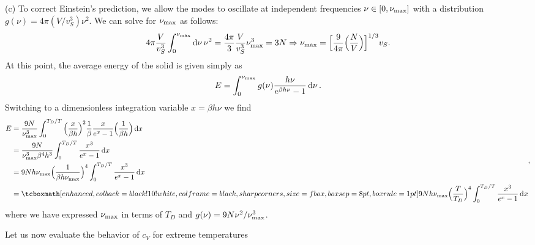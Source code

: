 {(c) To correct Einstein's prediction, we allow the modes to oscillate at independent frequencies $\nu \in [0,\nu_{\rm max}]$ with a distribution $g(\nu) = 4 \pi (V/v_{S}^3) \nu^2$.
We can solve for $\nu_{\rm max}$ as follows:
\begin{eqnarray}
    4 \pi \frac{V}{v_{S}^3} \int_{0}^{\nu_{\rm max}} \dd{\nu} \nu^2 = \frac{4 \pi}{3} \frac{V}{v_{S}^3} \nu_{\rm max}^3 = 3 N \Rightarrow \nu_{\rm max} = \Big[ \frac{9}{4 \pi} \Big( \frac{N}{V} \Big) \Big]^{1/3} v_{S}
.\end{eqnarray}
At this point, the average energy of the solid is given simply as 
\begin{eqnarray}
    E = \int_{0}^{\nu_{\rm max}} g(\nu) \frac{h \nu}{e^{\beta h \nu} - 1} \dd{\nu}
.\end{eqnarray}
Switching to a dimensionless integration variable $x = \beta h \nu$ we find
\begin{eqnarray}
    \begin{aligned}
        E &= \frac{9 N}{\nu_{\rm max}^3} \int_{0}^{T_{D}/T} \Big( \frac{x}{\beta h} \Big)^2 \frac{1}{\beta} \frac{x}{e^{x} - 1} \Big( \frac{1}{\beta h} \Big) \dd{x} \\
          &= \frac{9 N}{\nu_{\rm max}^3 \beta^{4} h^3} \int_{0}^{T_{D}/T} \frac{x^3}{e^{x}-1} \dd{x} \\
          &= 9 N h \nu_{\rm max} \Big( \frac{1}{\beta h \nu_{\rm max}} \Big)^{4} \int_{0}^{T_{D}/T} \frac{x^3}{e^{x} - 1} \dd{x} \\
          &= \eqbox{9 N h \nu_{\rm max} \Big( \frac{T}{T_{D}} \Big)^{4} \int_{0}^{T_{D}/T} \frac{x^3}{e^{x} - 1} \dd{x} }
    \end{aligned}
,\end{eqnarray}
where we have expressed $\nu_{\rm max}$ in terms of $T_{D}$ and $g(\nu) = 9 N \nu^2 / \nu_{\rm max}^3$.

Let us now evaluate the behavior of $c_{V}$ for extreme temperatures

}

